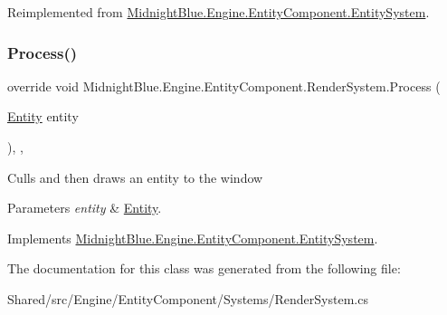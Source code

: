 Reimplemented from \hyperlink{class_midnight_blue_1_1_engine_1_1_entity_component_1_1_entity_system_a779da2924653b4402ca386dbc52bd3b1}{Midnight\+Blue.\+Engine.\+Entity\+Component.\+Entity\+System}.

\hypertarget{class_midnight_blue_1_1_engine_1_1_entity_component_1_1_render_system_aca6ccedef98243f0de2b2d83daa9a2bd}{}\label{class_midnight_blue_1_1_engine_1_1_entity_component_1_1_render_system_aca6ccedef98243f0de2b2d83daa9a2bd} 
\subsubsection{\texorpdfstring{Process()}{Process()}}
{\footnotesize\ttfamily override void Midnight\+Blue.\+Engine.\+Entity\+Component.\+Render\+System.\+Process (\begin{DoxyParamCaption}\item[{\hyperlink{class_midnight_blue_1_1_engine_1_1_entity_component_1_1_entity}{Entity}}]{entity }\end{DoxyParamCaption})\hspace{0.3cm}{\ttfamily [inline]}, {\ttfamily [protected]}, {\ttfamily [virtual]}}



Culls and then draws an entity to the window 


\begin{DoxyParams}{Parameters}
{\em entity} & \hyperlink{class_midnight_blue_1_1_engine_1_1_entity_component_1_1_entity}{Entity}.\\
\hline
\end{DoxyParams}


Implements \hyperlink{class_midnight_blue_1_1_engine_1_1_entity_component_1_1_entity_system_a94aa715ac6bfe9a720c3d12d56c7598c}{Midnight\+Blue.\+Engine.\+Entity\+Component.\+Entity\+System}.



The documentation for this class was generated from the following file\+:\begin{DoxyCompactItemize}
\item 
Shared/src/\+Engine/\+Entity\+Component/\+Systems/Render\+System.\+cs\end{DoxyCompactItemize}
